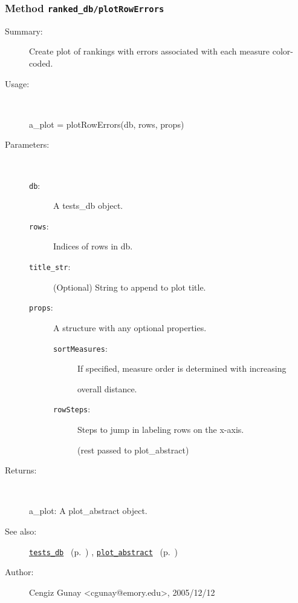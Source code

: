 \subsubsection[Method \texttt{plotRowErrors}]{Method \texttt{ranked\_db/plotRowErrors}}%
%
\label{ref_ranked_db__plotRowErrors}%
\hypertarget{ref_ranked_db__plotRowErrors}{}%
\begin{description}
\item[Summary:]Create plot of rankings with errors associated with each measure color-coded.
%
\item[Usage:]~%
\begin{lyxcode}%
a\_plot = plotRowErrors(db, rows, props)
%
\end{lyxcode}%
%
%
\item[Parameters:]~
\begin{description}%
\item[\texttt{db}:]
 A tests\_db object.
\item[\texttt{rows}:]
 Indices of rows in db.
\item[\texttt{title\_str}:]
 (Optional) String to append to plot title.
\item[\texttt{props}:]
 A structure with any optional properties.
\begin{description}%
\item[\texttt{sortMeasures}:]
 If specified, measure order is determined with increasing 

overall distance.\item[\texttt{rowSteps}:]
 Steps to jump in labeling rows on the x-axis.

(rest passed to plot\_abstract)\end{description}%
\end{description}%
%
\item[Returns:]~

	a\_plot: A plot\_abstract object.
%
%
\item[See also:]%
\hyperlink{ref_tests_db}{\texttt{tests\_db}}%
\ (p.~\pageref{ref_tests_db})%
%
, \hyperlink{ref_plot_abstract}{\texttt{plot\_abstract}}%
\ (p.~\pageref{ref_plot_abstract})%
%
%
\item[Author:]%
Cengiz Gunay <cgunay@emory.edu>, 2005/12/12%
\end{description}
\methodline%
